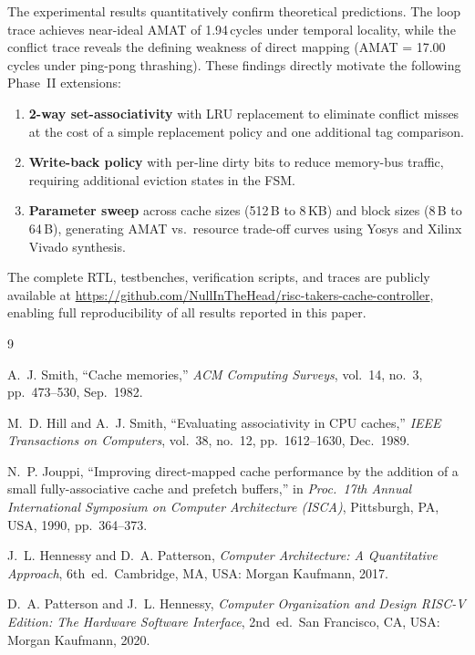 \documentclass[conference]{IEEEtran}
\renewcommand{\_}{\textunderscore\allowbreak{}}
\begin{document}
The experimental results quantitatively confirm theoretical predictions.
The loop trace achieves near-ideal AMAT of 1.94\,cycles under temporal
locality, while the conflict trace reveals the defining weakness of
direct mapping (AMAT = 17.00\,cycles under ping-pong thrashing). These
findings directly motivate the following Phase~II extensions:

\begin{enumerate}
  \item \textbf{2-way set-associativity} with LRU replacement to
        eliminate conflict misses at the cost of a simple replacement
        policy and one additional tag comparison.
  \item \textbf{Write-back policy} with per-line dirty bits to reduce
        memory-bus traffic, requiring additional eviction states in the
        FSM.
  \item \textbf{Parameter sweep} across cache sizes (512\,B to 8\,KB)
        and block sizes (8\,B to 64\,B), generating AMAT vs.\ resource
        trade-off curves using Yosys and Xilinx Vivado synthesis.
\end{enumerate}

The complete RTL, testbenches, verification scripts, and traces are
publicly available at
\url{https://github.com/NullInTheHead/risc-takers-cache-controller},
enabling full reproducibility of all results reported in this paper.

\newpage
\begin{thebibliography}{9}

A.~J. Smith, ``Cache memories,''
\emph{ACM Computing Surveys},
vol.~14, no.~3, pp.~473--530, Sep.\ 1982.

M.~D. Hill and A.~J. Smith, ``Evaluating associativity in CPU caches,''
\emph{IEEE Transactions on Computers},
vol.~38, no.~12, pp.~1612--1630, Dec.\ 1989.

N.~P. Jouppi, ``Improving direct-mapped cache performance by the addition
of a small fully-associative cache and prefetch buffers,'' in
\emph{Proc.\ 17th Annual International Symposium on Computer Architecture
(ISCA)}, Pittsburgh, PA, USA, 1990, pp.~364--373.

J.~L. Hennessy and D.~A. Patterson,
\emph{Computer Architecture: A Quantitative Approach}, 6th~ed.\
Cambridge, MA, USA: Morgan Kaufmann, 2017.

D.~A. Patterson and J.~L. Hennessy,
\emph{Computer Organization and Design RISC-V Edition:
The Hardware Software Interface}, 2nd~ed.\
San Francisco, CA, USA: Morgan Kaufmann, 2020.

\end{thebibliography}

\balance   %
\end{document}
